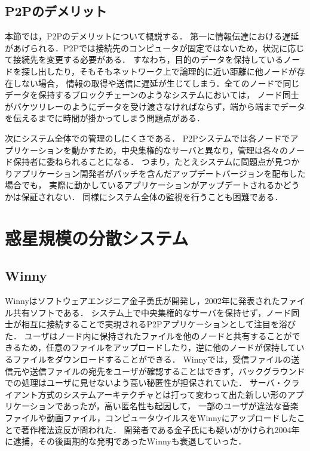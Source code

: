 \subsection{P2Pのデメリット}

本節では，P2Pのデメリットについて概説する．
第一に情報伝達における遅延があげられる．P2Pでは接続先のコンピュータが固定ではないため，状況に応じて接続先を変更する必要がある．
すなわち，目的のデータを保持しているノードを探し出したり，そもそもネットワーク上で論理的に近い距離に他ノードが存在しない場合，
情報の取得や送信に遅延が生じてしまう．全てのノードで同じデータを保持するブロックチェーンのようなシステムにおいては，
ノード同士がバケツリレーのようにデータを受け渡さなければならず，端から端までデータを伝えるまでに時間が掛かってしまう問題点がある．

次にシステム全体での管理のしにくさである．
P2Pシステムでは各ノードでアプリケーションを動かすため，中央集権的なサーバと異なり，管理は各々のノード保持者に委ねられることになる．
つまり，たとえシステムに問題点が見つかりアプリケーション開発者がパッチを含んだアップデートバージョンを配布した場合でも，
実際に動かしているアプリケーションがアップデートされるかどうかは保証されない．
同様にシステム全体の監視を行うことも困難である．

\section{惑星規模の分散システム}

\subsection{Winny}

Winnyはソフトウェアエンジニア金子勇氏が開発し，2002年に発表されたファイル共有ソフトである．
システム上で中央集権的なサーバを保持せず，ノード同士が相互に接続することで実現されるP2Pアプリケーションとして注目を浴びた．
ユーザはノード内に保持されたファイルを他のノードと共有することができるため，任意のファイルをアップロードしたり，逆に他のノードが保持しているファイルをダウンロードすることができる．
Winnyでは，受信ファイルの送信元や送信ファイルの宛先をユーザが確認することはできず，バックグラウンドでの処理はユーザに見せないよう高い秘匿性が担保されていた．
サーバ・クライアント方式のシステムアーキテクチャとは打って変わって出た新しい形のアプリケーションであったが，高い匿名性も起因して，
一部のユーザが違法な音楽ファイルや動画ファイル，コンピュータウイルスをWinnyにアップロードしたことで著作権法違反が問われた．
開発者である金子氏にも疑いがかけられ2004年に逮捕，その後画期的な発明であったWinnyも衰退していった．

